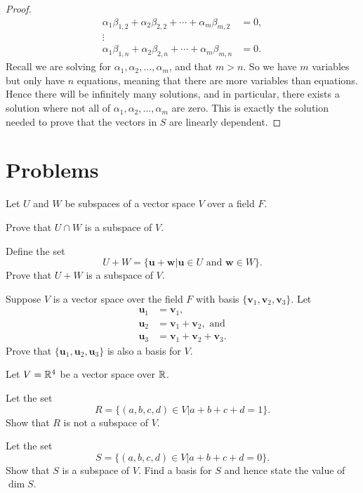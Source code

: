 \begin{proof}
\begin{align*}
        \alpha_1\beta_{1,2} + \alpha_2\beta_{2,2} + \cdots + \alpha_m\beta_{m,2} &= 0,\\
        \vdots\\
        \alpha_1\beta_{1,n} + \alpha_2\beta_{2,n} + \cdots + \alpha_m\beta_{m,n} &= 0.
    \end{align*}
    Recall we are solving for $\alpha_1, \alpha_2, \dots, \alpha_m$, and that $m > n$. So we have $m$ variables but only have $n$ equations, meaning that there are more variables than equations. Hence there will be infinitely many solutions, and in particular, there exists a solution where not all of $\alpha_1, \alpha_2, \dots, \alpha_m$ are zero. This is exactly the solution needed to prove that the vectors in $S$ are linearly dependent.
\end{proof}

\newpage

\section{Problems}
\begin{problem}
    Let $U$ and $W$ be subspaces of a vector space $V$ over a field $F$.
    \begin{partquestions}{\alph*}
        \item Prove that $U \cap W$ is a subspace of $V$.
        \item Define the set
        \[
            U + W = \{\mathbf{u} + \mathbf{w} \vert \mathbf{u} \in U \text{ and } \mathbf{w} \in W\}.
        \]
        Prove that $U + W$ is a subspace of $V$.
    \end{partquestions}
\end{problem}

\begin{problem}
    Suppose $V$ is a vector space over the field $F$ with basis $\{\mathbf{v}_1, \mathbf{v}_2, \mathbf{v}_3\}$. Let
    \begin{align*}
        \mathbf{u}_1 &= \mathbf{v}_1,\\
        \mathbf{u}_2 &= \mathbf{v}_1 + \mathbf{v}_2, \text{ and}\\
        \mathbf{u}_3 &= \mathbf{v}_1 + \mathbf{v}_2 + \mathbf{v}_3.
    \end{align*}
    Prove that $\{\mathbf{u}_1, \mathbf{u}_2, \mathbf{u}_3\}$ is also a basis for $V$.
\end{problem}

\begin{problem}
    Let $V = \mathbb{R}^4$ be a vector space over $\mathbb{R}$.
    \begin{partquestions}{\alph*}
        \item Let the set
        \[
            R = \{(a, b, c, d) \in V \vert a + b + c + d = 1\}.
        \]
        Show that $R$ is not a subspace of $V$.

        \item Let the set
        \[
            S = \{(a, b, c, d) \in V \vert a + b + c + d = 0\}.
        \]
        Show that $S$ is a subspace of $V$. Find a basis for $S$ and hence state the value of $\dim{S}$.
    \end{partquestions}
\end{problem}

